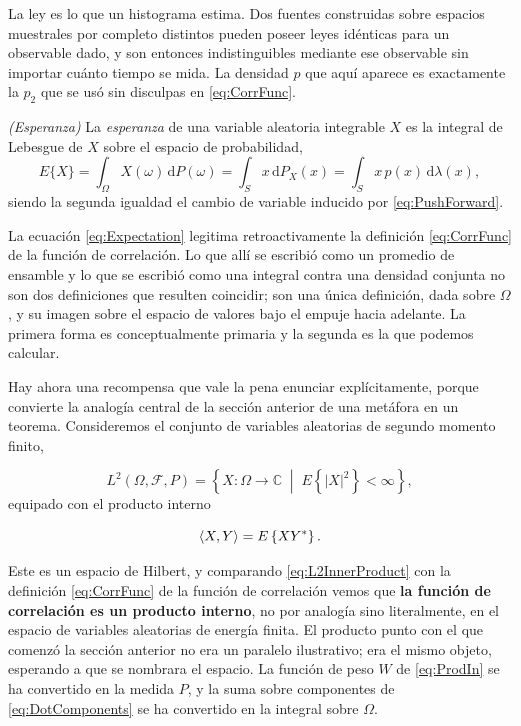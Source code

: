 		La ley es lo que un histograma estima. Dos fuentes construidas sobre espacios muestrales por completo distintos pueden poseer leyes idénticas para un observable dado, y son entonces indistinguibles mediante ese observable sin importar cuánto tiempo se mida. La densidad $p$ que aquí aparece es exactamente la $p_{2}$ que se usó sin disculpas en \eqref{eq:CorrFunc}.

		\begin{myDef}
			\textit{(Esperanza)} La \textit{esperanza} de una variable aleatoria integrable $X$ es la integral de Lebesgue de $X$ sobre el espacio de probabilidad,
			\begin{equation}\label{eq:Expectation}
				E\{X\} = \int_{\Omega}X(\omega)\,\mathrm{d}P(\omega)
				= \int_{S}x\,\mathrm{d}P_{X}(x) = \int_{S}x\,p(x)\,\mathrm{d}\lambda(x),
			\end{equation}
			siendo la segunda igualdad el cambio de variable inducido por \eqref{eq:PushForward}.
		\end{myDef}

		La ecuación \eqref{eq:Expectation} legitima retroactivamente la definición \eqref{eq:CorrFunc} de la función de correlación. Lo que allí se escribió como un promedio de ensamble y lo que se escribió como una integral contra una densidad conjunta no son dos definiciones que resulten coincidir; son una única definición, dada sobre $\Omega$, y su imagen sobre el espacio de valores bajo el empuje hacia adelante. La primera forma es conceptualmente primaria y la segunda es la que podemos calcular.

		Hay ahora una recompensa que vale la pena enunciar explícitamente, porque convierte la analogía central de la sección anterior de una metáfora en un teorema. Consideremos el conjunto de variables aleatorias de segundo momento finito,

		\begin{equation}\label{eq:L2Omega}
			L^{2}(\Omega,\mathcal{F},P) = \left\{X : \Omega\to\mathbb{C} \;\middle|\; E\left\{|X|^{2}\right\}<\infty\right\},
		\end{equation}
		equipado con el producto interno

		\begin{equation}\label{eq:L2InnerProduct}
			\braket{X,Y} = E\left\{XY^{*}\right\}.
		\end{equation}

		Este es un espacio de Hilbert, y comparando \eqref{eq:L2InnerProduct} con la definición \eqref{eq:CorrFunc} de la función de correlación vemos que \textbf{la función de correlación es un producto interno}, no por analogía sino literalmente, en el espacio de variables aleatorias de energía finita. El producto punto con el que comenzó la sección anterior no era un paralelo ilustrativo; era el mismo objeto, esperando a que se nombrara el espacio. La función de peso $W$ de \eqref{eq:ProdIn} se ha convertido en la medida $P$, y la suma sobre componentes de \eqref{eq:DotComponents} se ha convertido en la integral sobre $\Omega$.

